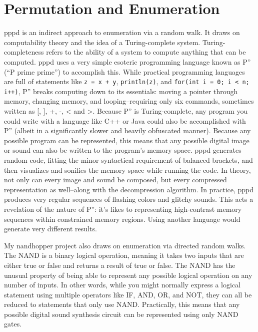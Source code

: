 \documentclass{thesis}
\begin{document}
\section{Permutation and Enumeration}
	pppd\cite{kyle_mcdonald_pppd_2009} is an indirect approach to enumeration via a random walk. It draws on computability theory\cite{boolos_computability_2002} and the idea of a Turing-complete system. Turing-completeness refers to the ability of a system to compute anything that can be computed. pppd uses a very simple esoteric programming language known as P'' (``P prime prime'') to accomplish this. While practical programming languages are full of statements like \verb!z = x + y!, \verb!println(z)!, and \verb!for(int i = 0; i < n; i++)!, P'' breaks computing down to its essentials: moving a pointer through memory, changing memory, and looping--requiring only six commands, sometimes written as [, ], +, -, < and >. Because P'' is Turing-complete, any program you could write with a language like C++ or Java could also be accomplished with P'' (albeit in a significantly slower and heavily obfuscated manner). Because any possible program can be represented, this means that any possible digital image or sound can also be written to the program's memory space. pppd generates random code, fitting the minor syntactical requirement of balanced brackets, and then visualizes and sonifies the memory space while running the code. In theory, not only can every image and sound be composed, but every compressed representation as well--along with the decompression algorithm. In practice, pppd produces very regular sequences of flashing colors and glitchy sounds. This acts a revelation of the nature of P'': it's likes to representing high-contrast memory sequences within constrained memory regions. Using another language would generate very different results.
	
	My nandhopper project\cite{kyle_mcdonald_nandhopper_2008} also draws on enumeration via directed random walks. The NAND is a binary logical operation, meaning it takes two inputs that are either true or false and returns a result of true or false. The NAND has the unusual property of being able to represent any possible logical operation on any number of inputs. In other words, while you might normally express a logical statement using multiple operators like IF, AND, OR, and NOT, they can all be reduced to statements that only use NAND. Practically, this means that any possible digital sound synthesis circuit can be represented using only NAND gates.
	
\end{document}

